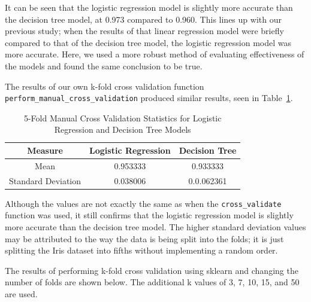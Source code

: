 \documentclass[journal]{IEEEtran}
\begin{document}
It can be seen that the logistic regression model is slightly more accurate than the decision tree model, at 0.973 compared to 0.960. This lines up with our previous study; when the results of that linear regression model were briefly compared to that of the decision tree model, the logistic regression model was more accurate. Here, we used a more robust method of evaluating effectiveness of the models and found the same conclusion to be true.

The results of our own k-fold cross validation function \lstinline{perform_manual_cross_validation} produced similar results, seen in Table~\ref{table:5FoldManualCV}. 

\begin{table}[h!]
\centering
\begin{tabular}{ c | c c }
Measure & Logistic Regression & Decision Tree \\
\hline
Mean & 0.953333 & 0.933333 \\
Standard Deviation & 0.038006 & 0.0.062361 \\
\end{tabular}
\caption{5-Fold Manual Cross Validation Statistics for Logistic Regression and Decision Tree Models}
\label{table:5FoldManualCV}
\end{table}

Although the values are not exactly the same as when the \lstinline{cross_validate} function was used, it still confirms that the logistic regression model is slightly more accurate than the decision tree model. The higher standard deviation values may be attributed to the way the data is being split into the folds; it is just splitting the Iris dataset into fifths without implementing a random order. 

The results of performing k-fold cross validation using sklearn and changing the number of folds are shown below. The additional k values of 3, 7, 10, 15, and 50 are used.
\end{document}
